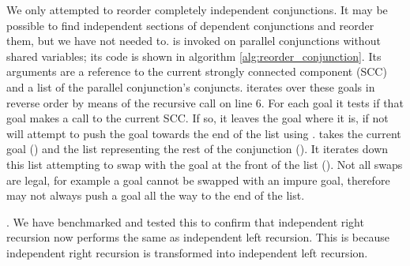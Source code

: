 We only attempted to reorder completely independent conjunctions.
It may be possible to find independent sections of dependent conjunctions
and reorder them,
but we have not needed to.
\reorder is invoked on parallel conjunctions without shared variables;
its code is shown in algorithm \ref{alg:reorder_conjunction}.
Its arguments are a reference to the current strongly connected component (SCC)
and a list of the parallel conjunction's conjuncts.
\reorder iterates over these goals in reverse order by means of the
recursive call on line 6.
For each goal it tests if that goal makes a call to the current SCC.
If so, it leaves the goal where it is,
if not \reorder will attempt to push the goal towards the end of the
list using \trypushconjlater.
\trypushconjlater takes the current goal () and the list
representing the rest of the conjunction ().
It iterates down this list attempting to swap  with the goal at
the front of the list ().
Not all swaps are legal,
for example a goal cannot be swapped with an impure goal,
therefore \trypushconjlater may not always push a goal all the way to the
end of the list.

.
We have benchmarked and tested this to confirm that independent right recursion
now performs the same as independent left recursion.
This is because independent right recursion is transformed into independent
left recursion.


